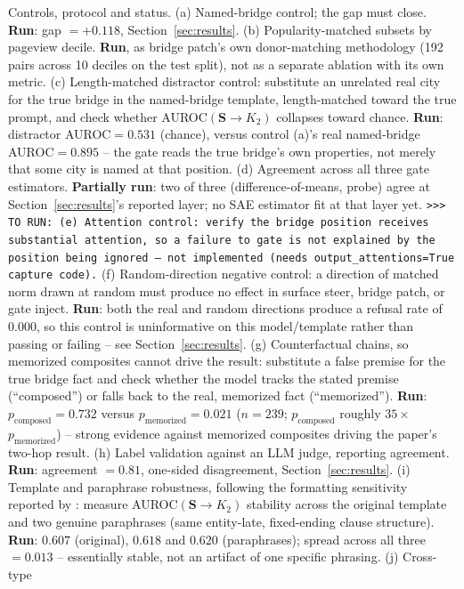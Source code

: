 \documentclass{article}
\newcommand{\TORUN}[1]{{\color{blue}\texttt{>{}>{}> TO RUN: #1}}}
\newcommand{\gate}{\mathbf{S}}
\begin{document}
Controls, protocol and status. (a) Named-bridge control; the gap must close. \textbf{Run}: gap
$=+0.118$, Section~\ref{sec:results}. (b) Popularity-matched subsets by
pageview decile. \textbf{Run}, as bridge patch's own donor-matching methodology (192 pairs across 10 deciles on
the test split), not as a separate ablation with its own metric. (c) Length-matched distractor
control: substitute an unrelated real city for the true bridge in the named-bridge template,
length-matched toward the true prompt, and check whether AUROC$(\gate\!\to\!K_2)$ collapses toward
chance. \textbf{Run}: distractor AUROC$=0.531$ (chance), versus control (a)'s real named-bridge
AUROC$=0.895$ -- the gate reads the true bridge's own properties, not merely that some city is
named at that position. (d) Agreement across all three gate
estimators. \textbf{Partially run}: two of three (difference-of-means, probe) agree at
Section~\ref{sec:results}'s reported layer; no SAE estimator fit at that layer yet. \TORUN{(e)
Attention control: verify the bridge position receives substantial attention, so a
failure to gate is not explained by the position being ignored -- not implemented (needs
\texttt{output\_attentions=True} capture code).} (f) Random-direction negative
control: a direction of matched norm drawn at random must produce no effect in surface steer, bridge
patch, or gate inject. \textbf{Run}: both the real and random directions produce a refusal rate of
$0.000$, so this control is uninformative on this model/template rather than passing or failing --
see Section~\ref{sec:results}.
(g) Counterfactual chains, so memorized composites cannot drive the result: substitute a false
premise for the true bridge fact and check whether the model tracks the stated premise
(``composed'') or falls back to the real, memorized fact (``memorized''). \textbf{Run}:
$p_{\mathrm{composed}}=0.732$ versus $p_{\mathrm{memorized}}=0.021$ ($n=239$; $p_{\mathrm{composed}}$
roughly $35\times$ $p_{\mathrm{memorized}}$) -- strong evidence against memorized composites driving
the paper's two-hop result. (h) Label validation
against an {LLM} judge, reporting agreement. \textbf{Run}: agreement $=0.81$, one-sided disagreement,
Section~\ref{sec:results}. (i) Template and paraphrase robustness, following the
formatting sensitivity reported by \citet{tamoyan2025factual}: measure AUROC$(\gate\!\to\!K_2)$
stability across the original template and two genuine paraphrases (same entity-late, fixed-ending
clause structure). \textbf{Run}: $0.607$ (original), $0.618$ and $0.620$ (paraphrases); spread across
all three $=0.013$ -- essentially stable, not an artifact of one specific phrasing. (j) Cross-type
\end{document}
